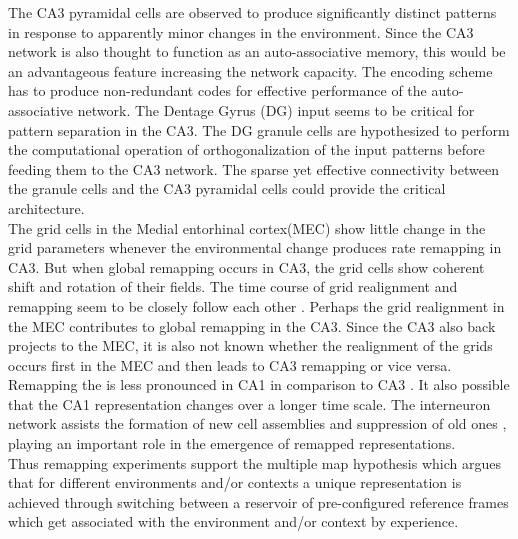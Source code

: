 The CA3 pyramidal cells are observed to produce significantly distinct patterns in response to apparently minor changes in the environment. Since the CA3 network is also thought to function as an auto-associative memory, this would be an advantageous feature increasing the network capacity. The encoding scheme has to produce non-redundant codes for effective performance of the auto-associative network. The Dentage Gyrus (DG) input seems to be critical for pattern separation in the CA3. The DG granule cells are hypothesized to perform the computational operation of orthogonalization of the input patterns before feeding them to the CA3 network. The sparse yet effective connectivity between the granule cells and the CA3 pyramidal cells could provide the critical architecture.\\ The grid cells in the Medial entorhinal cortex(MEC) show little change in the grid parameters whenever the environmental change produces rate remapping in CA3. But when global remapping occurs in CA3, the grid cells show coherent shift and rotation of their fields. The time course of grid realignment and remapping seem to be closely follow each other \cite{Fyhn2007}. Perhaps the grid realignment in the MEC contributes to global remapping in the CA3. Since the CA3 also back projects to the MEC, it is also not known whether the realignment of the grids occurs first in the MEC and then leads to CA3 remapping or vice versa. Remapping the is less pronounced in CA1 in comparison to CA3 \cite{Leutgeb2005a, Leutgeb2004}. It also possible that the CA1 representation changes over a longer time scale. The interneuron network assists the formation of new cell assemblies and suppression of old ones \cite{Dupret2013}, playing an important role in the emergence of remapped representations.\\ 

Thus remapping experiments support the multiple map hypothesis which argues that for different environments and/or contexts a unique representation is achieved through switching between a reservoir of pre-configured reference frames which get associated with the environment and/or context by experience.
